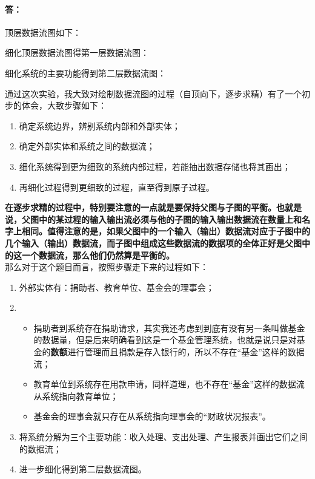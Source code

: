 \newpage
\paragraph{答：}
顶层数据流图如下：
\begin{minipage}{\textwidth}
	
\end{minipage}

\newpage
细化顶层数据流图得第一层数据流图：
\begin{minipage}{\textwidth}
	
\end{minipage}

\newpage
细化系统的主要功能得到第二层数据流图：
\begin{minipage}{\textwidth}
	
\end{minipage}

\newpage
通过这次实验，我大致对绘制数据流图的过程（自顶向下，逐步求精）有了一个初步的体会，大致步骤如下：
\begin{enumerate}
	\item 确定系统边界，辨别系统内部和外部实体；
	\item 确定外部实体和系统之间的数据流；
	\item 细化系统得到更为细致的系统内部过程，若能抽出数据存储也将其画出；
	\item 再细化过程得到更细致的过程，直至得到原子过程。
\end{enumerate}
\textbf{在逐步求精的过程中，特别要注意的一点就是要保持父图与子图的平衡。也就是说，父图中的某过程的输入输出流必须与他的子图的输入输出数据流在数量上和名字上相同。值得注意的是，如果父图中的一个输入（输出）数据流对应于子图中的几个输入（输出）数据流，而子图中组成这些数据流的数据项的全体正好是父图中的这一个数据流，那么他们仍然算是平衡的。} \\

那么对于这个题目而言，按照步骤走下来的过程如下：
\begin{enumerate}
	\item 外部实体有：捐助者、教育单位、基金会的理事会；
	\item 
	\begin{itemize}
		\item 
		捐助者到系统存在捐助请求，其实我还考虑到到底有没有另一条叫做基金的数据量，但是后来明确看到这是一个基金管理系统，也就是说只是对基金的\textbf{数额}进行管理而且捐款是存入银行的，所以不存在“基金”这样的数据流；
		
		\item 
		教育单位到系统存在用款申请，同样道理，也不存在“基金”这样的数据流从系统指向教育单位；
		
		\item
		基金会的理事会就只存在从系统指向理事会的“财政状况报表”。
	\end{itemize}
	\item 将系统分解为三个主要功能：收入处理、支出处理、产生报表并画出它们之间的数据流；
	\item 进一步细化得到第二层数据流图。
\end{enumerate}